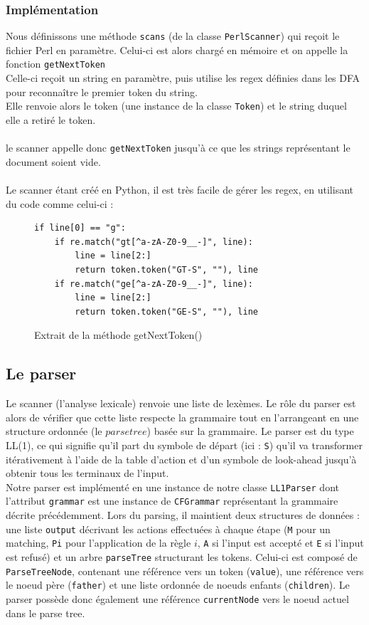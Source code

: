 \documentclass[a4paper,10pt]{article}
\begin{document}
	\subsubsection{Implémentation}
	Nous définissons une méthode \verb?scans? (de la classe \verb?PerlScanner?) qui reçoit le fichier Perl en paramètre. Celui-ci est alors chargé en mémoire et on appelle la fonction \verb?getNextToken?\\
	Celle-ci reçoit un string en paramètre, puis utilise les regex définies dans les DFA pour reconnaître le premier token du string.\\
	Elle renvoie alors le token (une instance de la classe \verb?Token?) et le string duquel elle a retiré le token.\\
	~\\
	le scanner appelle donc \verb?getNextToken? jusqu'à ce que les strings représentant le document soient vide.\\
	~\\
	Le scanner étant créé en Python, il est très facile de gérer les regex, en utilisant du code comme celui-ci :
\begin{figure}[H]
\begin{lstlisting}
if line[0] == "g":
	if re.match("gt[^a-zA-Z0-9__-]", line):
		line = line[2:]
		return token.token("GT-S", ""), line
	if re.match("ge[^a-zA-Z0-9__-]", line):
		line = line[2:]
		return token.token("GE-S", ""), line
\end{lstlisting}
\fontfamily{}
\caption{Extrait de la méthode getNextToken()}
\label{lst:getNextToken}
\end{figure}

\subsection{Le parser}

Le scanner (l'analyse lexicale) renvoie une liste de lexèmes. Le rôle du parser est alors de vérifier que cette liste respecte la grammaire tout en l'arrangeant en une structure ordonnée (le $parse tree$) basée sur la grammaire. Le parser est du type LL(1), ce qui signifie qu'il part du symbole de départ (ici : \verb?S?) qu'il va transformer itérativement à l'aide de la table d'action et d'un symbole de look-ahead jusqu'à obtenir tous les terminaux de l'input.\\

Notre parser est implémenté en une instance de notre classe \verb?LL1Parser? dont l'attribut \verb?grammar? est une instance de \verb?CFGrammar? représentant la grammaire décrite précédemment. Lors du parsing, il maintient deux structures de données : une liste \verb?output? décrivant les actions effectuées à chaque étape (\verb?M? pour un matching, \verb?Pi? pour l'application de la règle $i$, \verb?A? si l'input est accepté et \verb?E? si l'input est refusé) et un arbre \verb?parseTree? structurant les tokens. Celui-ci est composé de \verb?ParseTreeNode?, contenant une référence vers un token (\verb?value?), une référence vers le noeud père (\verb?father?) et une liste ordonnée de noeuds enfants (\verb?children?). Le parser possède donc également une référence \verb?currentNode? vers le noeud actuel dans le parse tree.\\
\end{document}
